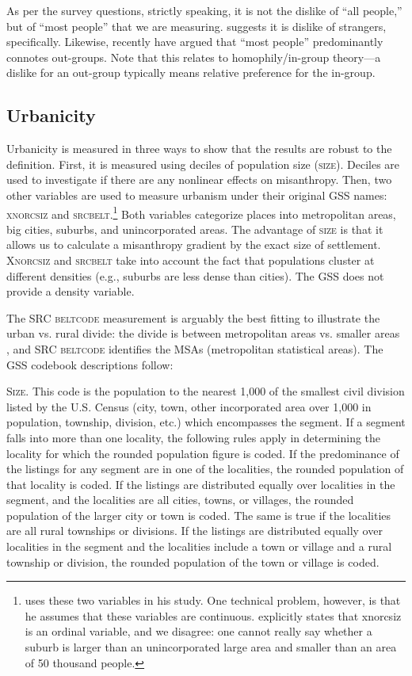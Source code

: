 \documentclass[11pt, letterpaper]{article}
\begin{document}
\begin{spacing}{1.4}
As per the survey questions, strictly speaking, it is not the dislike of ``all people,'' but of ``most people''  that we are measuring. \citet{wilson85} suggests it is dislike of strangers, specifically. Likewise, recently \citet{delhey11} have argued that ``most people'' predominantly connotes out-groups. Note that this relates to homophily/in-group theory---a dislike for an out-group typically means relative preference for the in-group. 

 
\subsection*{Urbanicity}

Urbanicity is measured in three ways to show that the
results are robust to the definition. First, it is measured using deciles of population size
(\textsc{size}). Deciles are used to investigate if there are any nonlinear
effects on misanthropy. Then, two other variables are used to measure urbanism under their original GSS names: \textsc{xnorcsiz} and \textsc{srcbelt}.\footnote{\citet{wilson85} uses these two variables in his study. One technical problem, however, is that he assumes that these variables are continuous. \citet{wilson85} explicitly states that xnorcsiz is an ordinal variable, and we disagree: one cannot really say whether a suburb is larger than an unincorporated large area and smaller than an area of 50 thousand people.} Both variables categorize places into metropolitan areas, big cities, suburbs, and  unincorporated areas. The advantage of \textsc{size} is that it allows us to calculate a misanthropy 
 gradient by the exact size of settlement. \textsc{Xnorcsiz} and \textsc{srcbelt} take into account the fact that populations cluster at different densities (e.g., suburbs are less dense than cities). The GSS does not provide a density variable. 

The \textsc{SRC beltcode} measurement is arguably the best fitting to illustrate the
urban vs. rural divide: the divide is between metropolitan areas vs. smaller areas
\citep{hansonCityJournalautumn15}, and \textsc{SRC beltcode} identifies the MSAs
(metropolitan statistical areas). The GSS codebook descriptions follow: 

\textsc{Size}. This code is the population to the nearest 1,000 of the smallest civil
division listed by the U.S. Census (city, town, other incorporated
area over 1,000 in population, township, division, etc.) which
encompasses the segment. If a segment falls into more than one
locality, the following rules apply in determining the locality for
which the rounded population figure is coded.
If the predominance of the listings for any segment are in one of the
localities, the rounded population of that locality is coded.
If the listings are distributed equally over localities in the
segment, and the localities are all cities, towns, or villages, the
rounded population of the larger city or town is coded. The same is
true if the localities are all rural townships or divisions.
If the listings are distributed equally over localities in the segment
and the localities include a town or village and a rural township or
division, the rounded population of the town or village is coded.


\end{spacing}
\end{document}
